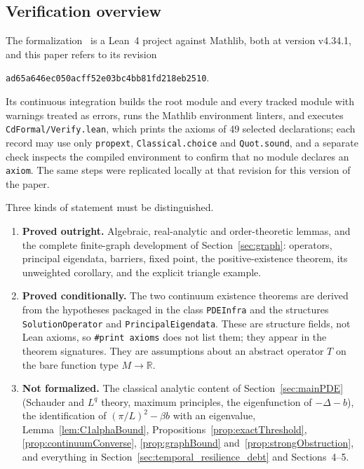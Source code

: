 \documentclass[11pt]{article}
\theoremstyle{plain}
\theoremstyle{definition}
\theoremstyle{remark}
\newcommand{\R}{\mathbb{R}}
\begin{document}
\subsection{Verification overview}
The formalization~\cite{Spence2026Lean} is a Lean~4 project against Mathlib, both at version v4.34.1, and this paper refers to its revision
\begin{center}\texttt{ad65a646ec050acff52e03bc4bb81fd218eb2510}.\end{center}
Its continuous integration builds the root module and every tracked module with warnings treated as errors, runs the Mathlib environment linters, and executes \texttt{CdFormal/Verify.lean}, which prints the axioms of 49 selected declarations; each record may use only \texttt{propext}, \texttt{Classical.choice} and \texttt{Quot.sound}, and a separate check inspects the compiled environment to confirm that no module declares an \texttt{axiom}. The same steps were replicated locally at that revision for this version of the paper.

Three kinds of statement must be distinguished.
\begin{enumerate}[leftmargin=2em]
\item \textbf{Proved outright.} Algebraic, real-analytic and order-theoretic lemmas, and the complete finite-graph development of Section~\ref{sec:graph}: operators, principal eigendata, barriers, fixed point, the positive-existence theorem, its unweighted corollary, and the explicit triangle example.
\item \textbf{Proved conditionally.} The two continuum existence theorems are derived from the hypotheses packaged in the class \texttt{PDEInfra} and the structures \texttt{SolutionOperator} and \texttt{PrincipalEigendata}. These are structure fields, not Lean axioms, so \texttt{\#print axioms} does not list them; they appear in the theorem signatures. They are assumptions about an abstract operator \(T\) on the bare function type \(M\to\R\).
\item \textbf{Not formalized.} The classical analytic content of Section~\ref{sec:mainPDE} (Schauder and \(L^q\) theory, maximum principles, the eigenfunction of \(-\Delta-b\)), the identification of \((\pi/L)^2-\beta b\) with an eigenvalue, Lemma~\ref{lem:C1alphaBound}, Propositions~\ref{prop:exactThreshold}, \ref{prop:continuumConverse}, \ref{prop:graphBound} and~\ref{prop:strongObstruction}, and everything in Section~\ref{sec:temporal_resilience_debt} and Sections~4--5.
\end{enumerate}
\end{document}
